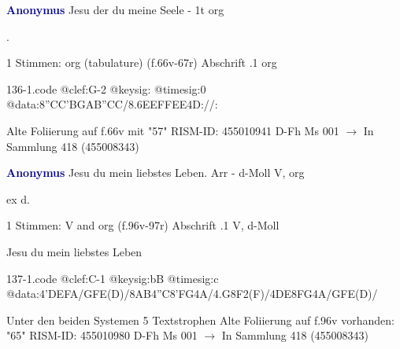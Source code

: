 \documentclass[twocolumn]{book}
\begin{document}
\newline \par \vspace{7pt} \textcolor{darkblue}{\textbf{Anonymus  }}
\newline Jesu der du meine Seele - 1t
\newline org
\newline \begin{itshape}[f.66v, at left:] .\end{itshape} 
\newline \textcolor{darkblue}{}  1 Stimmen: org (tabulature)  (f.66v-67r)
\newline Abschrift
.1  org  
\begin{filecontents*}{136-1.code}
@clef:G-2
@keysig:
@timesig:0
@data:{8''CC'BG}{AB''CC}/{8.6EEFF}{EE}4D://:
\end{filecontents*}
\newline
%
\newline Alte Foliierung auf f.66v mit "57"
\newline RISM-ID: 455010941
\newline D-Fh  Ms 001
\newline $\rightarrow$ In Sammlung 418 (455008343)
      
\newline \par \vspace{7pt} \textcolor{darkblue}{\textbf{Anonymus  }}
\newline Jesu du mein liebstes Leben. Arr - d-Moll
\newline V, org
\newline \begin{itshape}[f.96v, at left:] ex d.\end{itshape} 
\newline \textcolor{darkblue}{}  1 Stimmen: V and org  (f.96v-97r)
\newline Abschrift
.1  V, d-Moll
\newline \begin{footnotesize} Jesu du mein liebstes Leben \end{footnotesize}  
\begin{filecontents*}{137-1.code}
@clef:C-1
@keysig:bB
@timesig:c
@data:4'DEFA/GFE(D)/{8AB}4''C{8'FG}4A/4.G8F2(F)/4DE{8FG}4A/GFE(D)/
\end{filecontents*}
\newline
%
\newline Unter den beiden Systemen 5 Textstrophen
\newline Alte Foliierung auf f.96v vorhanden: "65"
\newline RISM-ID: 455010980
\newline D-Fh  Ms 001
\newline $\rightarrow$ In Sammlung 418 (455008343)
      
\end{document}
